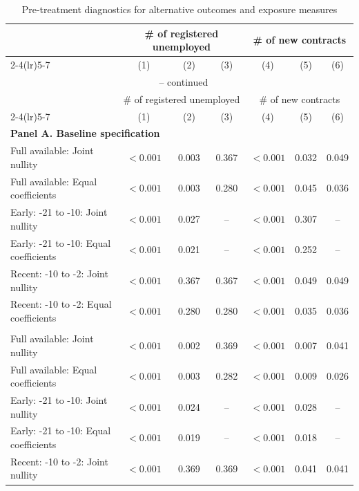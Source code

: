 \begingroup
\scriptsize
\renewcommand{\arraystretch}{0.88}
\setlength{\tabcolsep}{2.0pt}
\setlength{\parskip}{0pt}
\begin{longtable}{@{}lcccccc@{}}
\caption{Pre-treatment diagnostics for alternative outcomes and exposure measures}\label{tab:v1_robustness_pretrends}\\
\toprule
& \multicolumn{3}{c}{\# of registered unemployed} & \multicolumn{3}{c}{\# of new contracts} \\
\cmidrule(lr){2-4}\cmidrule(lr){5-7}
& (1) & (2) & (3) & (4) & (5) & (6) \\
\midrule
\endfirsthead
\multicolumn{7}{c}{\tablename\ \thetable{} -- continued} \\
\toprule
& \multicolumn{3}{c}{\# of registered unemployed} & \multicolumn{3}{c}{\# of new contracts} \\
\cmidrule(lr){2-4}\cmidrule(lr){5-7}
& (1) & (2) & (3) & (4) & (5) & (6) \\
\midrule
\endhead
\multicolumn{7}{l}{\textbf{Panel A. Baseline specification}} \\
Full available: Joint nullity & $<0.001$ & 0.003 & 0.367 & $<0.001$ & 0.032 & 0.049 \\
Full available: Equal coefficients & $<0.001$ & 0.003 & 0.280 & $<0.001$ & 0.045 & 0.036 \\
Early: -21 to -10: Joint nullity & $<0.001$ & 0.027 & -- & $<0.001$ & 0.307 & -- \\
Early: -21 to -10: Equal coefficients & $<0.001$ & 0.021 & -- & $<0.001$ & 0.252 & -- \\
Recent: -10 to -2: Joint nullity & $<0.001$ & 0.367 & 0.367 & $<0.001$ & 0.049 & 0.049 \\
Recent: -10 to -2: Equal coefficients & $<0.001$ & 0.280 & 0.280 & $<0.001$ & 0.035 & 0.036 \\
\addlinespace[5pt]
\multicolumn{7}{l}{\textbf{Panel B. Alternative outcomes: log(Y+1)}} \\
Full available: Joint nullity & $<0.001$ & 0.002 & 0.369 & $<0.001$ & 0.007 & 0.041 \\
Full available: Equal coefficients & $<0.001$ & 0.003 & 0.282 & $<0.001$ & 0.009 & 0.026 \\
Early: -21 to -10: Joint nullity & $<0.001$ & 0.024 & -- & $<0.001$ & 0.028 & -- \\
Early: -21 to -10: Equal coefficients & $<0.001$ & 0.019 & -- & $<0.001$ & 0.018 & -- \\
Recent: -10 to -2: Joint nullity & $<0.001$ & 0.369 & 0.369 & $<0.001$ & 0.041 & 0.041 \\

\end{longtable}
